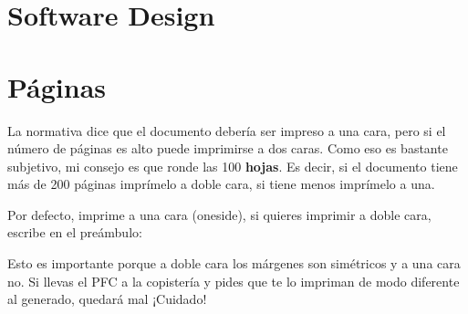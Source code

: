 \section{Software Design}




\section{Páginas}
\label{sec:paginas}

La normativa dice que el documento debería ser impreso a una cara, pero si el
número de páginas es alto puede imprimirse a dos caras. Como eso es bastante
subjetivo, mi consejo es que ronde las 100 \textbf{hojas}. Es decir, si el
documento tiene más de 200 páginas imprímelo a doble cara, si tiene menos
imprímelo a una.

Por defecto, \arcopfc{} imprime a una cara (oneside), si quieres imprimir a doble cara,
escribe en el preámbulo:


Esto es importante porque a doble cara los márgenes son simétricos y a una cara
no. Si llevas el PFC a la copistería y pides que te lo impriman de modo
diferente al generado, quedará mal ¡Cuidado!
